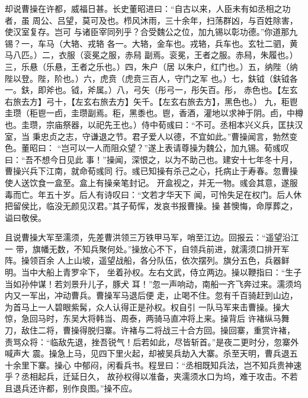 却说曹操在许都，威福日甚。长史董昭进曰：“自古以来，人臣未有如丞相之功者，虽
周公、吕望，莫可及也。栉风沐雨，三十余年，扫荡群凶，与百姓除害，使汉室复存。岂可
与诸臣宰同列乎？合受魏公之位，加九锡以彰功德。”你道那九锡？一，车马（大辂、戎辂
各一。大辂，金车也。戎辂，兵车也。玄牡二驷，黄马八匹。）二，衣服（衮冕之服，赤舄
副焉。衮冕，王者之服。赤舄，朱履也。）三，乐悬（乐悬，王者之乐也。）四，朱户（居
以朱户，红门也。）五，纳陛（纳陛以登。陛，阶也。）六，虎贲（虎贲三百人，守门之军
也。）七，鈇钺（鈇钺各一。鈇，即斧也。钺，斧属。）八，弓矢（彤弓一，彤矢百。彤，
赤色也。【左玄右旅去方】弓十，【左玄右旅去方】矢千。【左玄右旅去方】，黑色也。）
九，秬鬯圭瓒（秬鬯一卣，圭瓒副焉。秬，黑黍也。鬯，香酒，灌地以求神于阴。卣，中樽
也。圭瓒，宗庙祭器，以祀先王也。）侍中荀彧曰：“不可。丞相本兴义兵，匡扶汉室，当
秉忠贞之志，守谦退之节。君子爱人以德，不宜如此。”曹操闻言，勃然变色。董昭曰：
“岂可以一人而阻众望？”遂上表请尊操为魏公，加九锡。荀彧叹曰：“吾不想今日见此
事！”操闻，深恨之，以为不助己也。建安十七年冬十月，曹操兴兵下江南，就命荀彧同
行。彧已知操有杀己之心，托病止于寿春。忽曹操使人送饮食一盒至。盒上有操亲笔封记。
开盒视之，并无一物。彧会其意，遂服毒而亡。年五十岁。后人有诗叹曰：“文若才华天下
闻，可怜失足在权门。后人休把留侯比，临没无颜见汉君。”其子荀恽，发哀书报曹操。操
甚懊悔，命厚葬之，谥曰敬侯。

且说曹操大军至濡须，先差曹洪领三万铁甲马军，哨至江边。回报云：“遥望沿江一
带，旗幡无数，不知兵聚何处。”操放心不下，自领兵前进，就濡须口排开军阵。操领百余
人上山坡，遥望战船，各分队伍，依次摆列。旗分五色，兵器鲜明。当中大船上青罗伞下，
坐着孙权。左右文武，侍立两边。操以鞭指曰：“生子当如孙仲谋！若刘景升儿子，豚犬
耳！”忽一声响动，南船一齐飞奔过来。濡须坞内又一军出，冲动曹兵。曹操军马退后便
走，止喝不住。忽有千百骑赶到山边，为首马上一人碧眼紫髯，众人认得正是孙权。权自引
一队马军来击曹操。操大惊，急回马时，东吴大将韩当、周泰，两骑马直冲将上来。操背后
许褚纵马舞刀，敌住二将，曹操得脱归寨。许褚与二将战三十合方回。操回寨，重赏许褚，
责骂众将：“临敌先退，挫吾锐气！后若如此，尽皆斩首。”是夜二更时分，忽寨外喊声大
震。操急上马，见四下里火起，却被吴兵劫入大寨。杀至天明，曹兵退五十余里下寨。操心
中郁闷，闲看兵书。程昱曰：“丞相既知兵法，岂不知兵贵神速乎？丞相起兵，迁延日久，
故孙权得以准备，夹濡须水口为坞，难于攻击。不若且退兵还许都，别作良图。”操不应。

